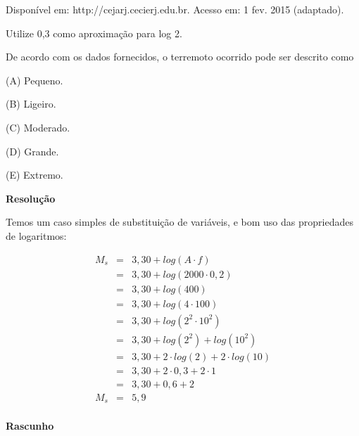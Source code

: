 {\scriptsize 
    \begin{flushright}
        Disponível em: http://cejarj.cecierj.edu.br. Acesso em: 1 fev. 2015 (adaptado). 
    \end{flushright}
}

Utilize 0,3 como aproximação para log 2. 

De acordo com os dados fornecidos, o terremoto ocorrido pode ser descrito como

(A) Pequeno.

(B) Ligeiro.

(C) Moderado.

(D) Grande.

(E) Extremo.



\textbf{Resolução}

Temos um caso simples de substituição de variáveis, e bom uso das propriedades de logaritmos:


\begin{eqnarray*}
    M_{s} 	&=& 3,30 + log(A \cdot f) \\
            &=& 3,30 + log(2000 \cdot 0,2) \\
            &=& 3,30 + log(400) \\
            &=& 3,30 + log(4 \cdot 100) \\
            &=& 3,30 + log(2^{2} \cdot 10^{2}) \\
            &=& 3,30 + log(2^{2}) + log(10^{2}) \\
            &=& 3,30 + 2 \cdot log(2) + 2 \cdot log(10) \\
            &=& 3,30 + 2 \cdot 0,3 + 2 \cdot 1 \\
            &=& 3,30 + 0,6 + 2 \\
      M_{s} &=& 5,9 \\
\end{eqnarray*}


\textbf{Rascunho}

\qquad




